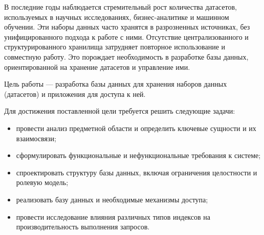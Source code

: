
В последние годы наблюдается стремительный рост количества датасетов,
используемых в научных исследованиях, бизнес-аналитике и машинном обучении.
Эти наборы данных часто хранятся в разрозненных источниках, без унифицированного подхода
к работе с ними.
Отсутствие централизованного и структурированного хранилища затрудняет повторное использование
и совместную работу.
Это порождает необходимость в разработке базы данных, ориентированной на хранение датасетов и управление ими.


Цель работы --- разработка базы данных для хранения
наборов данных (датасетов) и приложения для доступа к ней.


Для достижения поставленной цели требуется решить следующие задачи:
\begin{itemize}
    \item провести анализ предметной области и определить ключевые сущности и их взаимосвязи;
    \item сформулировать функциональные и нефункциональные требования к системе;
    \item спроектировать структуру базы данных, включая ограничения целостности и ролевую модель;
    \item реализовать базу данных и необходимые механизмы доступа;
    \item провести исследование влияния различных типов индексов на производительность выполнения запросов.
\end{itemize}